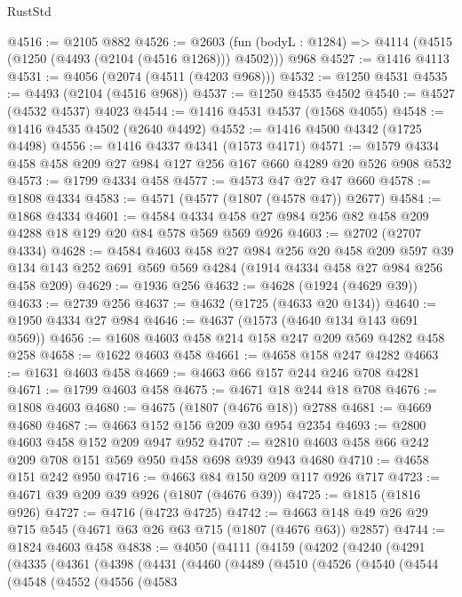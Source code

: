 \begin{lexlean}{RustStd}
\begin{coremodule}
{\begin{coremodule}
{{{{{{{{{{{{{@4516 := @2105 @882
@4526 := @2603
    (fun (bodyL : @1284) => @4114 (@4515 (@1250 (@4493 (@2104 (@4516 @1268))) @4502)))
    @968
@4527 := @1416 @4113
@4531 := @4056 (@2074 (@4511 (@4203 @968)))
@4532 := @1250 @4531
@4535 := @4493 (@2104 (@4516 @968))
@4537 := @1250 @4535 @4502
@4540 := @4527 (@4532 @4537) @4023
@4544 := @1416 @4531 @4537 (@1568 @4055)
@4548 := @1416 @4535 @4502 (@2640 @4492)
@4552 := @1416 @4500 @4342 (@1725 @4498)
@4556 := @1416 @4337 @4341 (@1573 @4171)
@4571 := @1579 @4334 @458 @458 @209 @27 @984 @127 @256 @167 @660 @4289 @20 @526 @908 @532
@4573 := @1799 @4334 @458
@4577 := @4573 @47 @27 @47 @660
@4578 := @1808 @4334
@4583 := @4571 (@4577 (@1807 (@4578 @47)) @2677)
@4584 := @1868 @4334
@4601 := @4584 @4334 @458 @27 @984 @256 @82 @458 @209 @4288 @18 @129 @20 @84 @578 @569 @569 @926
@4603 := @2702 (@2707 @4334)
@4628 := @4584
    @4603
    @458
    @27
    @984
    @256
    @20
    @458
    @209
    @597
    @39
    @134
    @143
    @252
    @691
    @569
    @569
    @4284
    (@1914 @4334 @458 @27 @984 @256 @458 @209)
@4629 := @1936 @256
@4632 := @4628 (@1924 (@4629 @39))
@4633 := @2739 @256
@4637 := @4632 (@1725 (@4633 @20 @134))
@4640 := @1950 @4334 @27 @984
@4646 := @4637 (@1573 (@4640 @134 @143 @691 @569))
@4656 := @1608 @4603 @458 @214 @158 @247 @209 @569 @4282 @458 @258
@4658 := @1622 @4603 @458
@4661 := @4658 @158 @247 @4282
@4663 := @1631 @4603 @458
@4669 := @4663 @66 @157 @244 @246 @708 @4281
@4671 := @1799 @4603 @458
@4675 := @4671 @18 @244 @18 @708
@4676 := @1808 @4603
@4680 := @4675 (@1807 (@4676 @18)) @2788
@4681 := @4669 @4680
@4687 := @4663 @152 @156 @209 @30 @954 @2354
@4693 := @2800 @4603 @458 @152 @209 @947 @952
@4707 := @2810 @4603 @458 @66 @242 @209 @708 @151 @569 @950 @458 @698 @939 @943 @4680
@4710 := @4658 @151 @242 @950
@4716 := @4663 @84 @150 @209 @117 @926 @717
@4723 := @4671 @39 @209 @39 @926 (@1807 (@4676 @39))
@4725 := @1815 (@1816 @926)
@4727 := @4716 (@4723 @4725)
@4742 := @4663 @148 @49 @26 @29 @715 @545 (@4671 @63 @26 @63 @715 (@1807 (@4676 @63)) @2857)
@4744 := @1824 @4603 @458
@4838 := @4050
    (@4111
      (@4159
        (@4202
          (@4240
            (@4291
              (@4335
                (@4361
                  (@4398
                    (@4431
                      (@4460
                        (@4489
                          (@4510
                            (@4526
                              (@4540
                                (@4544
                                  (@4548
                                    (@4552
                                      (@4556
                                        (@4583
}}}}}}}}}}}}}
\end{coremodule}}
\end{coremodule}
\end{lexlean}
